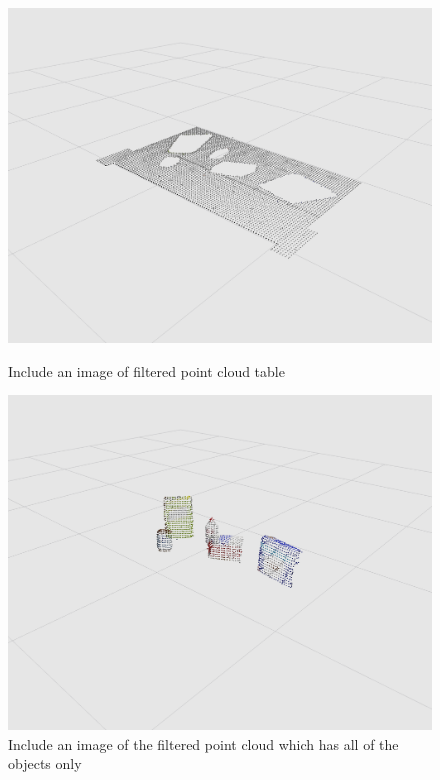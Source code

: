 \documentclass[a4paper]{article}
\begin{document}
\vspace{0.25cm}

\begin{figure}[h]
\centering
\begin{minipage}{0.45\linewidth}
\centering
\includegraphics[scale=0.2]{image6}
\caption{Include an image of filtered point cloud table}
\end{minipage}
\hspace{0.5cm}
\begin{minipage}{0.45\linewidth}
\centering
\includegraphics[scale=0.2]{image8}
\caption{Include an image of the filtered point cloud which has all of the objects only}
\end{minipage}
\end{figure}
\end{document}
